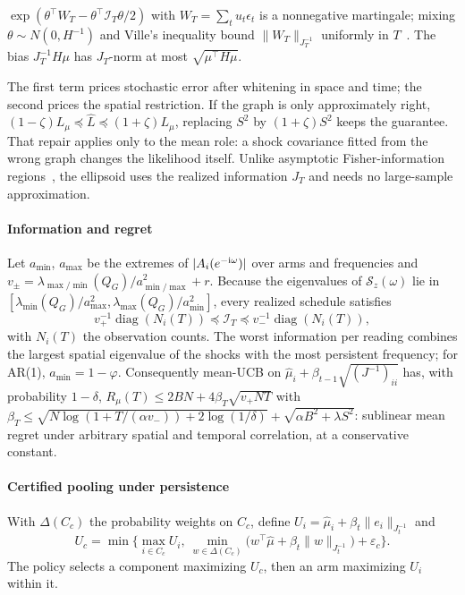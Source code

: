 \documentclass[conference]{IEEEtran}
\newcommand{\diag}{\operatorname{diag}}
\newcommand{\I}{\mathcal{I}}
\begin{document}
\begin{IEEEproof}[Sketch]
$\exp(\theta^\top W_T-\theta^\top\I_T\theta/2)$ with $W_T=\sum_tu_t\epsilon_t$ is a nonnegative martingale; mixing $\theta\sim N(0,H^{-1})$ and Ville's inequality bound $\|W_T\|_{J_T^{-1}}$ uniformly in $T$~\cite{abbasi2011improved}. The bias $J_T^{-1}H\mu$ has $J_T$-norm at most $\sqrt{\mu^\top H\mu}$.
\end{IEEEproof}

The first term prices stochastic error after whitening in space and time; the second prices the spatial restriction. If the graph is only approximately right, $(1-\zeta)L_\mu\preceq\hat L\preceq(1+\zeta)L_\mu$, replacing $S^2$ by $(1+\zeta)S^2$ keeps the guarantee. That repair applies only to the mean role: a shock covariance fitted from the wrong graph changes the likelihood itself. Unlike asymptotic Fisher-information regions~\cite{zhang2025fisher}, the ellipsoid uses the realized information $J_T$ and needs no large-sample approximation.

\paragraph*{Information and regret} Let $a_{\min}$, $a_{\max}$ be the extremes of $|A_i(e^{-{\rm i}\omega})|$ over arms and frequencies and $v_\pm=\lambda_{\max/\min}(Q_G)/a_{\min/\max}^2+r$. Because the eigenvalues of $\mathcal S_z(\omega)$ lie in $[\lambda_{\min}(Q_G)/a_{\max}^2,\lambda_{\max}(Q_G)/a_{\min}^2]$, every realized schedule satisfies
\[
v_+^{-1}\diag(N_i(T))\preceq\I_T\preceq v_-^{-1}\diag(N_i(T)),
\]
with $N_i(T)$ the observation counts. The worst information per reading combines the largest spatial eigenvalue of the shocks with the most persistent frequency; for AR(1), $a_{\min}=1-\varphi$. Consequently mean-UCB on $\hat\mu_i+\beta_{t-1}\sqrt{(J^{-1})_{ii}}$ has, with probability $1-\delta$, $R_\mu(T)\le2BN+4\beta_T\sqrt{v_+NT}$ with $\beta_T\le\sqrt{N\log(1+T/(\alpha v_-))+2\log(1/\delta)}+\sqrt{\alpha B^2+\lambda S^2}$: sublinear mean regret under arbitrary spatial and temporal correlation, at a conservative constant.

\paragraph*{Certified pooling under persistence} With $\Delta(C_c)$ the probability weights on $C_c$, define $U_i=\hat\mu_i+\beta_t\|e_i\|_{J_t^{-1}}$ and
\[
U_c=\min\Big\{\max_{i\in C_c}U_i,\ \min_{w\in\Delta(C_c)}\big(w^\top\hat\mu+\beta_t\|w\|_{J_t^{-1}}\big)+\varepsilon_c\Big\}.
\]
The policy selects a component maximizing $U_c$, then an arm maximizing $U_i$ within it.
\end{document}
